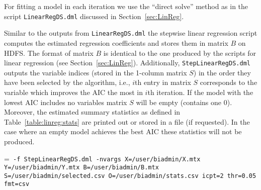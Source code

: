 For fitting a model in each iteration we use the ``direct solve'' method as in the script {\tt LinearRegDS.dml} discussed in Section~\ref{sec:LinReg}.  


\smallskip
{}
\smallskip

Similar to the outputs from {\tt LinearRegDS.dml} the stepwise linear regression script computes 
the estimated regression coefficients and stores them in matrix $B$ on HDFS. 
The format of matrix $B$ is identical to the one produced by the scripts for linear regression (see Section~\ref{sec:LinReg}).   
Additionally, {\tt StepLinearRegDS.dml} outputs the variable indices (stored in the 1-column matrix $S$) 
in the order they have been selected by the algorithm, i.e., $i$th entry in matrix $S$ corresponds to 
the variable which improves the AIC the most in $i$th iteration.  
If the model with the lowest AIC includes no variables matrix $S$ will be empty (contains one 0). 
Moreover, the estimated summary statistics as defined in Table~\ref{table:linreg:stats}
are printed out or stored in a file (if requested). 
In the case where an empty model achieves the best AIC these statistics will not be produced. 


\smallskip
{}
\smallskip

{\hangindent=\parindent\noindent\tt
	\hml -f StepLinearRegDS.dml -nvargs X=/user/biadmin/X.mtx Y=/user/biadmin/Y.mtx
	B=/user/biadmin/B.mtx S=/user/biadmin/selected.csv O=/user/biadmin/stats.csv
	icpt=2 thr=0.05 fmt=csv
	
}


